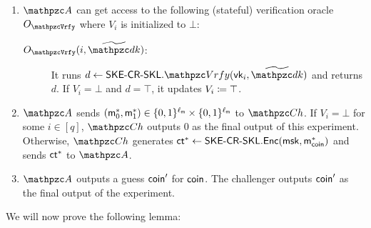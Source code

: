 \begin{description}
\begin{enumerate}
\item $\qA$ can
get access to the following (stateful) verification oracle
$\Oracle{\qVrfy}$ where $V_i$ is initialized to $\bot$:

\begin{description} \item[
        $\Oracle{\qVrfy}(i, \widetilde{\qdk})$:] It runs $d
        \gets \SKECRSKL.\qVrfy(\vk_i, \widetilde{\qdk})$ and returns $d$.
        If $V_i=\bot$ and $d=\top$, it updates $V_i\coloneqq
        \top$. 
\end{description}

\item $\qA$ sends $(\mathsf{m}_0^*,\mathsf{m}_1^*)\in 
\{0,1\}^{\ell_{\mathsf{m}}} \times \{0,1\}^{\ell_{\mathsf{m}}}$ to $\qCh$. If $V_i=\bot$ for
some $i\in[q]$, $\qCh$ outputs $0$ as the final output of this
experiment. Otherwise, $\qCh$ generates
$\mathsf{ct}^*\leftarrow\mathsf{SKE}\textrm{-}\mathsf{CR}\textrm{-}\mathsf{SKL}.\mathsf{Enc}(\mathsf{msk},\mathsf{m}_{\mathsf{coin}}^*)$ and sends $\mathsf{ct}^*$ to
$\qA$.

\item $\qA$ outputs a guess $\mathsf{coin}^\prime$ for $\mathsf{coin}$. The 
challenger outputs $\mathsf{coin}'$ as the final output of the 
experiment.
\end{enumerate}
\end{description}

We will now prove the following lemma:

